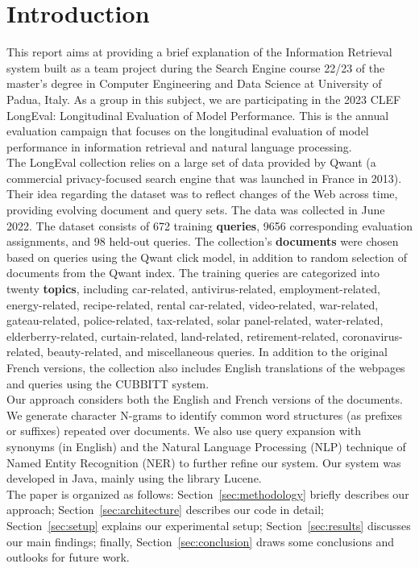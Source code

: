 \section{Introduction}\label{sec:introduction}
This report aims at providing a brief explanation of the Information Retrieval system built
as a team project during the Search Engine course 22/23 of the master’s degree in Computer
Engineering and Data Science at University of Padua, Italy.
As a group in this subject, we are participating in the 2023 CLEF LongEval: Longitudinal Evaluation of Model
Performance.
This is the annual evaluation campaign that focuses on the longitudinal evaluation of model performance in information
retrieval and natural language processing.\\
The LongEval collection\cite{traindata} relies on a large set of data provided by Qwant (a commercial privacy-focused
search engine that was launched in France in 2013). %
Their idea regarding the dataset was to reflect changes of the Web across time, providing evolving document and query
sets.
The data was collected in June 2022.
The dataset consists of 672 training \textbf{queries}, 9656 corresponding evaluation assignments, and 98 held-out queries.
The collection's \textbf{documents} were chosen based on queries using the Qwant click model, in addition to random
selection of documents from the Qwant index.
The training queries are categorized into twenty \textbf{topics}, including car-related, antivirus-related,
employment-related, energy-related, recipe-related, rental car-related, video-related, war-related, gateau-related,
police-related, tax-related, solar panel-related, water-related, elderberry-related, curtain-related, land-related,
retirement-related, coronavirus-related, beauty-related, and miscellaneous queries.
In addition to the original French versions, the collection also includes English translations of the webpages and
queries using the CUBBITT system.\\
Our approach considers both the English and French versions of the documents.
We generate character N-grams to identify common word structures (as prefixes or suffixes) repeated over documents.
We also use query expansion with synonyms (in English) and the Natural Language Processing (NLP) technique of Named
Entity Recognition (NER) to further refine our system.
Our system was developed in Java, mainly using the library Lucene.\\
The paper is organized as follows:
Section~\ref{sec:methodology} briefly describes our approach;
Section~\ref{sec:architecture} describes our code in detail;
Section~\ref{sec:setup} explains our experimental setup;
Section~\ref{sec:results} discusses our main findings; finally,
Section~\ref{sec:conclusion} draws some conclusions and outlooks for future work.